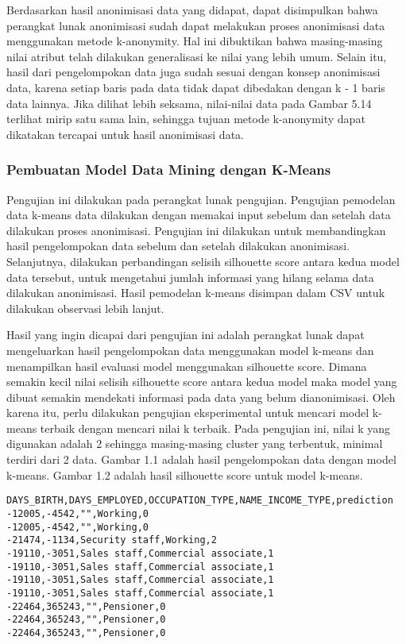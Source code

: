 \vspace{0.5cm}

Berdasarkan hasil anonimisasi data yang didapat, dapat disimpulkan bahwa perangkat lunak anonimisasi sudah dapat melakukan proses anonimisasi data menggunakan metode k-anonymity. Hal ini dibuktikan bahwa masing-masing nilai atribut telah dilakukan generalisasi ke nilai yang lebih umum. Selain itu, hasil dari pengelompokan data juga sudah sesuai dengan konsep anonimisasi data, karena setiap baris pada data tidak dapat dibedakan dengan k - 1 baris data lainnya. Jika dilihat lebih seksama, nilai-nilai data pada Gambar 5.14 terlihat mirip satu sama lain, sehingga tujuan metode k-anonymity dapat dikatakan tercapai untuk hasil anonimisasi data.

\subsubsection{Pembuatan Model Data Mining dengan K-Means}

Pengujian ini dilakukan pada perangkat lunak pengujian. Pengujian pemodelan data k-means data dilakukan dengan memakai input sebelum dan setelah data dilakukan proses anonimisasi. Pengujian ini dilakukan untuk membandingkan hasil pengelompokan data  sebelum dan setelah dilakukan anonimisasi. Selanjutnya, dilakukan perbandingan selisih silhouette score antara kedua model data tersebut, untuk mengetahui jumlah informasi yang hilang selama data dilakukan anonimisasi. Hasil pemodelan k-means disimpan dalam CSV untuk dilakukan observasi lebih lanjut.

Hasil yang ingin dicapai dari pengujian ini adalah perangkat lunak dapat mengeluarkan hasil pengelompokan data menggunakan model k-means dan menampilkan hasil evaluasi model menggunakan silhouette score. Dimana semakin kecil nilai selisih silhouette score antara kedua model maka model yang dibuat semakin mendekati informasi pada data yang belum dianonimisasi. Oleh karena itu, perlu dilakukan pengujian eksperimental untuk mencari model k-means terbaik dengan mencari nilai k terbaik. Pada pengujian ini, nilai k yang digunakan adalah 2 sehingga masing-masing cluster yang terbentuk, minimal terdiri dari 2 data. Gambar 1.1 adalah hasil pengelompokan data dengan model k-means. Gambar 1.2 adalah hasil silhouette score untuk model k-means.

\begin{lstlisting}[basicstyle=\ttfamily, frame=single,
	columns=fullflexible, keepspaces=true, breaklines=true, label=lst:fungsional_kmeans1, caption=Hasil Pengelompokan K-Means Sebelum Anonimisasi]
DAYS_BIRTH,DAYS_EMPLOYED,OCCUPATION_TYPE,NAME_INCOME_TYPE,prediction
-12005,-4542,"",Working,0
-12005,-4542,"",Working,0
-21474,-1134,Security staff,Working,2
-19110,-3051,Sales staff,Commercial associate,1
-19110,-3051,Sales staff,Commercial associate,1
-19110,-3051,Sales staff,Commercial associate,1
-19110,-3051,Sales staff,Commercial associate,1
-22464,365243,"",Pensioner,0
-22464,365243,"",Pensioner,0
-22464,365243,"",Pensioner,0
\end{lstlisting}

